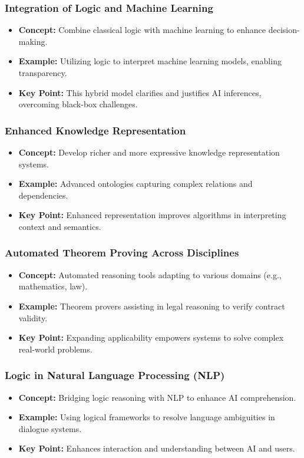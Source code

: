 \documentclass[aspectratio=169]{beamer}
\begin{document}
\begin{frame}[fragile]
    \frametitle{Integration of Logic and Machine Learning}
    \begin{itemize}
        \item \textbf{Concept:} Combine classical logic with machine learning to enhance decision-making.
        \item \textbf{Example:} Utilizing logic to interpret machine learning models, enabling transparency.
        \item \textbf{Key Point:} This hybrid model clarifies and justifies AI inferences, overcoming black-box challenges.
    \end{itemize}
\end{frame}

\begin{frame}[fragile]
    \frametitle{Enhanced Knowledge Representation}
    \begin{itemize}
        \item \textbf{Concept:} Develop richer and more expressive knowledge representation systems.
        \item \textbf{Example:} Advanced ontologies capturing complex relations and dependencies.
        \item \textbf{Key Point:} Enhanced representation improves algorithms in interpreting context and semantics.
    \end{itemize}
\end{frame}

\begin{frame}[fragile]
    \frametitle{Automated Theorem Proving Across Disciplines}
    \begin{itemize}
        \item \textbf{Concept:} Automated reasoning tools adapting to various domains (e.g., mathematics, law).
        \item \textbf{Example:} Theorem provers assisting in legal reasoning to verify contract validity.
        \item \textbf{Key Point:} Expanding applicability empowers systems to solve complex real-world problems.
    \end{itemize}
\end{frame}

\begin{frame}[fragile]
    \frametitle{Logic in Natural Language Processing (NLP)}
    \begin{itemize}
        \item \textbf{Concept:} Bridging logic reasoning with NLP to enhance AI comprehension.
        \item \textbf{Example:} Using logical frameworks to resolve language ambiguities in dialogue systems.
        \item \textbf{Key Point:} Enhances interaction and understanding between AI and users.
    \end{itemize}
\end{frame}
\end{document}
